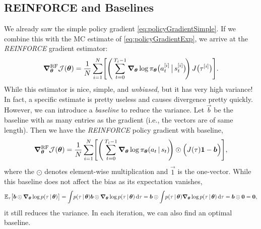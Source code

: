 		\subsection{REINFORCE and Baselines}
			We already saw the simple policy gradient \eqref{eq:policyGradientSimple}. If we combine this with the \ac{MC} estimate of \eqref{eq:policyGradientExp}, we arrive at the \emph{REINFORCE} gradient estimator:
			\begin{equation}
				\grad_{\bm{\theta}}^\mathrm{RF} \mathcal{J}(\bm{\theta})
					= \frac{1}{N} \sum_{i = 1}^{N} \Biggl[ \Biggl(\, \sum_{t = 0}^{T_i - 1} \grad_{\bm{\theta}} \log \pi_{\bm{\theta}}\bigl( a_t^{[i]} \,\big\vert\, s_t^{[i]} \bigr) \!\Biggr)\, J\bigl( \tau^{[i]} \bigr) \Biggr].
			\end{equation}
			While this estimator is nice, simple, and \emph{unbiased,} but it has very high variance! In fact, a specific estimate is pretty useless and causes divergence pretty quickly. However, we can introduce a \emph{baseline} to reduce the variance. Let \(\vec{b}\) be the baseline with as many entries as the gradient (i.e., the vectors are of same length). Then we have the \emph{REINFORCE} policy gradient with baseline,
			\begin{equation}
				\grad_{\bm{\theta}}^\mathrm{RF} \mathcal{J}(\bm{\theta})
					= \frac{1}{N} \sum_{i = 1}^{N} \Biggl[ \Biggl(\, \sum_{t = 0}^{T_i - 1} \grad_{\bm{\theta}} \log \pi_{\bm{\theta}}(a_t \,\vert\, s_t) \!\Biggr) \odot \Bigl( J(\tau) \bm{1} - \bm{b} \Bigr) \Biggr],
				\label{eq:reinforceArbitraryBaseline}
			\end{equation}
			where the \(\odot\) denotes element-wise multiplication and \(\vec{1}\) is the one-vector. While this baseline does not affect the bias as its expectation vanishes,
			\begin{equation}
				\mathbb{E}_\tau\bigl[ \bm{b} \odot \grad_{\bm{\theta}} \log p(\tau \,\vert\, \bm{\theta}) \bigr]
					= \int\! p(\tau \,\vert\, \bm{\theta}) \bm{b} \odot \grad_{\bm{\theta}} \log p(\tau \,\vert\, \bm{\theta}) \dd{\tau}
					= \bm{b} \odot \int\! p(\tau \,\vert\, \bm{\theta}) \grad_{\bm{\theta}} \log p(\tau \,\vert\, \bm{\theta}) \dd{\tau}
					= \bm{b} \odot \bm{0}
					= \bm{0},
			\end{equation}
			it still reduces the variance. In each iteration, we can also find an optimal baseline.

